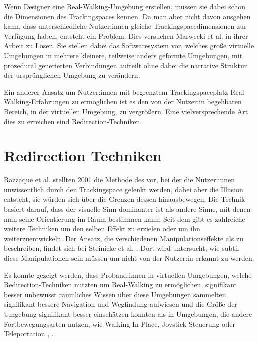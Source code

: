 Wenn Designer eine Real-Walking-Umgebung erstellen, müssen sie dabei schon die Dimensionen des Trackingspaces kennen. Da man aber nicht davon ausgehen kann, dass unterschiedliche Nutzer:innen gleiche Trackingspacedimensionen zur Verfügung haben, entsteht ein Problem. Dies versuchen Marwecki et al. in ihrer Arbeit \cite{scenograph} zu Lösen. Sie stellen dabei das Softwaresystem  vor, welches große virtuelle Umgebungen in mehrere kleinere, teilweise anders geformte Umgebungen, mit prozedural generierten Verbindungen aufteilt ohne dabei die narrative Struktur der ursprünglichen Umgebung zu verändern.

Ein anderer Ansatz um Nutzer:innen mit begrenztem Trackingspaceplatz Real-Walking-Erfahrungen zu ermöglichen ist es den von der Nutzer:in begehbaren Bereich, in der virtuellen Umgebung, zu vergrößern.
Eine vielversprechende Art dies zu erreichen sind Redirection-Techniken.

\section{Redirection Techniken}
Razzaque et al. \cite{rdw-razzaque} stellten 2001 die Methode des  vor, bei der die Nutzer:innen unwissentlich durch den Trackingspace gelenkt werden, dabei aber die Illusion entsteht, sie würden sich über die Grenzen dessen hinausbewegen. Die Technik basiert darauf, dass der visuelle Sinn dominanter ist als andere Sinne, mit denen man seine Orientierung im Raum bestimmen kann.
Seit dem gibt es zahlreiche weitere Techniken um den selben Effekt zu erzielen oder um ihn weiterzuentwickeln. Der Ansatz, die verschiedenen Manipulationseffekte als  zu beschreiben, findet sich bei Steinicke et al. \cite{detection-thresholds}. Dort wird untersucht, wie subtil diese Manipulationen sein müssen um nicht von der Nutzer:in erkannt zu werden.

Es konnte gezeigt werden, dass Proband:innen in virtuellen Umgebungen, welche Redirection-Techniken nutzten um Real-Walking zu ermöglichen, signifikant besser unbewusst räumliches Wissen über diese Umgebungen sammelten, signifikant bessere Navigation und Wegfindung aufwiesen und die Größe der Umgebung signifikant besser einschätzen konnten als in Umgebungen, die andere Fortbewegungsarten nutzen, wie Walking-In-Place, Joystick-Steuerung oder Teleportation \cite{peck-vergleich-2011}, \cite{langbehn-vergleich-2018}.

